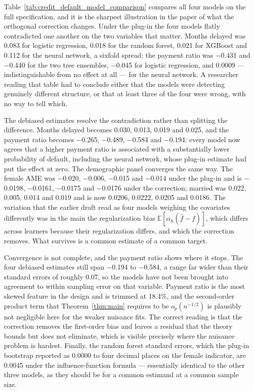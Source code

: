 \documentclass[12pt,a4paper]{article}
\numberwithin{equation}{section}
\theoremstyle{plain}
\theoremstyle{definition}
\newcommand{\E}{\mathbb{E}}
\begin{document}
	Table~\ref{tab:credit_default_model_comparison} compares all four models on the full specification, and it is the sharpest illustration in the paper of what the orthogonal correction changes. Under the plug-in the four models flatly contradicted one another on the two variables that matter. Months delayed was 0.083 for logistic regression, 0.018 for the random forest, 0.021 for XGBoost and 0.112 for the neural network, a sixfold spread; the payment ratio was $-$0.431 and $-$0.440 for the two tree ensembles, $-$0.045 for logistic regression, and 0.0009 --- indistinguishable from no effect at all --- for the neural network. A researcher reading that table had to conclude either that the models were detecting genuinely different structure, or that at least three of the four were wrong, with no way to tell which.

	The debiased estimates resolve the contradiction rather than splitting the difference. Months delayed becomes 0.030, 0.013, 0.019 and 0.025, and the payment ratio becomes $-$0.265, $-$0.489, $-$0.584 and $-$0.194: every model now agrees that a higher payment ratio is associated with a substantially lower probability of default, including the neural network, whose plug-in estimate had put the effect at zero. The demographic panel converges the same way. The female AME was $-$0.020, $-$0.006, $-$0.015 and $-$0.014 under the plug-in and is $-$0.0198, $-$0.0161, $-$0.0175 and $-$0.0176 under the correction; married was 0.022, 0.005, 0.014 and 0.019 and is now 0.0206, 0.0222, 0.0205 and 0.0186. The variation that the earlier draft read as four models weighing the covariates differently was in the main the regularization bias $\E[\alpha_h(\hat f - f)]$, which differs across learners because their regularization differs, and which the correction removes. What survives is a common estimate of a common target.

	Convergence is not complete, and the payment ratio shows where it stops. The four debiased estimates still span $-$0.194 to $-$0.584, a range far wider than their standard errors of roughly 0.07, so the models have not been brought into agreement to within sampling error on that variable. Payment ratio is the most skewed feature in the design and is trimmed at 18.4\%, and the second-order product term that Theorem~\ref{thm:main} requires to be $o_p(n^{-1/2})$ is plausibly not negligible here for the weaker nuisance fits. The correct reading is that the correction removes the first-order bias and leaves a residual that the theory bounds but does not eliminate, which is visible precisely where the nuisance problem is hardest. Finally, the random forest standard errors, which the plug-in bootstrap reported as 0.0000 to four decimal places on the female indicator, are 0.0045 under the influence-function formula --- essentially identical to the other three models, as they should be for a common estimand at a common sample size.
	
\end{document}

